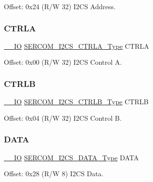 Offset\+: 0x24 (R/W 32) I2\+CS Address. 

\mbox{\label{struct_sercom_i2cs_a15ba97e28a7ab147edf9ee49ec334a33}} 
\subsubsection{\texorpdfstring{CTRLA}{CTRLA}}
{\footnotesize\ttfamily \mbox{\hyperlink{core__cm0plus_8h_aec43007d9998a0a0e01faede4133d6be}{\+\_\+\+\_\+\+IO}} \mbox{\hyperlink{union_s_e_r_c_o_m___i2_c_s___c_t_r_l_a___type}{S\+E\+R\+C\+O\+M\+\_\+\+I2\+C\+S\+\_\+\+C\+T\+R\+L\+A\+\_\+\+Type}} C\+T\+R\+LA}



Offset\+: 0x00 (R/W 32) I2\+CS Control A. 

\mbox{\label{struct_sercom_i2cs_ae4cbbc6fff3c083d9c8b46fed1cfe552}} 
\subsubsection{\texorpdfstring{CTRLB}{CTRLB}}
{\footnotesize\ttfamily \mbox{\hyperlink{core__cm0plus_8h_aec43007d9998a0a0e01faede4133d6be}{\+\_\+\+\_\+\+IO}} \mbox{\hyperlink{union_s_e_r_c_o_m___i2_c_s___c_t_r_l_b___type}{S\+E\+R\+C\+O\+M\+\_\+\+I2\+C\+S\+\_\+\+C\+T\+R\+L\+B\+\_\+\+Type}} C\+T\+R\+LB}



Offset\+: 0x04 (R/W 32) I2\+CS Control B. 

\mbox{\label{struct_sercom_i2cs_af706164a38adbb9f3f4767f3d8056e84}} 
\subsubsection{\texorpdfstring{DATA}{DATA}}
{\footnotesize\ttfamily \mbox{\hyperlink{core__cm0plus_8h_aec43007d9998a0a0e01faede4133d6be}{\+\_\+\+\_\+\+IO}} \mbox{\hyperlink{union_s_e_r_c_o_m___i2_c_s___d_a_t_a___type}{S\+E\+R\+C\+O\+M\+\_\+\+I2\+C\+S\+\_\+\+D\+A\+T\+A\+\_\+\+Type}} D\+A\+TA}



Offset\+: 0x28 (R/W 8) I2\+CS Data. 

